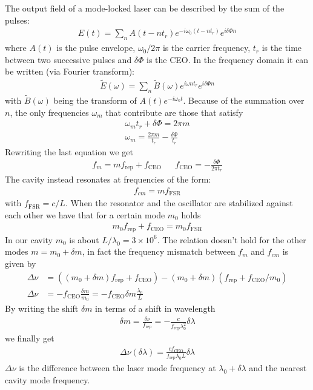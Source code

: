 The output field of a mode-locked laser can be described by the sum of the pulses:
\begin{align}
E(t) = \sum_{n} A(t-nt_r) e^{-i\omega_0 (t - nt_r)} e^{i \delta\Phi n}
\end{align}
where $A(t)$ is the pulse envelope, $\omega_0/2\pi$ is the carrier frequency, $t_r$ is the time between two successive pulses and $\delta\Phi$ is the CEO.
In the frequency domain it can be written (via Fourier transform):
\begin{align}
\tilde{E}(\omega) = \sum_n \tilde{B}(\omega) e^{i\omega n t_r} e^{i \delta\Phi n}
\end{align}
with $\tilde{B}(\omega)$ being the transform of $A(t) e^{-i\omega_0 t}$.
Because of the summation over $n$, the only frequencies $\omega_m$ that contribute are those that satisfy
\begin{align}
	\omega_m t_r + \delta \Phi = 2\pi m \\
	\omega_m = \frac{2\pi m}{t_r} -\frac{\delta \Phi}{t_r}
\end{align} 
Rewriting the last equation we get
\begin{align}
f_m = m f_\mathrm{rep} + f_\mathrm{CEO} && f_\mathrm{CEO} = -\frac{\delta \Phi}{2\pi t_r}
\end{align}
The cavity instead resonates at frequencies of the form:
\begin{align}
f_{cm} = m f_\mathrm{FSR}
\end{align}
with $f_\mathrm{FSR} = c/L$.
When the resonator and the oscillator are stabilized against each other we have that for a certain mode $m_0$ holds
\begin{align}
	m_0 f_\mathrm{rep} + f_\mathrm{CEO} = m_0 f_\mathrm{FSR}
\end{align}
In our cavity $m_0$ is about $L/\lambda_0=3\times10^6$. The relation doesn't hold for the other modes $m = m_0 +\delta m$, in fact the frequency mismatch between $f_m$ and $f_{cm}$ is given by 
\begin{align}
\Delta \nu &=  ((m_0+\delta m) f_\mathrm{rep} + f_\mathrm{CEO})-(m_0+\delta m)(f_\mathrm{rep} + f_\mathrm{CEO}/m_0)\\
\Delta \nu &= -f_\mathrm{CEO}\frac{\delta m}{m_0} = -f_\mathrm{CEO}\delta m\frac{\lambda_0}{L}
\end{align}
By writing the shift $\delta m $ in terms of a shift in wavelength
\begin{align}
	\delta m = \frac{\delta \nu}{f_\mathrm{rep}} = -\frac{c}{f_\mathrm{rep}\lambda_0^2}\delta\lambda
\end{align}
we finally get
\begin{align}
	\Delta \nu(\delta\lambda) = \frac{c f_\mathrm{CEO}}{f_\mathrm{rep}\lambda_0 L}\delta\lambda
\end{align}
$\Delta \nu$ is the difference between the laser mode frequency at $\lambda_0+\delta\lambda$ and the nearest cavity mode frequency.

